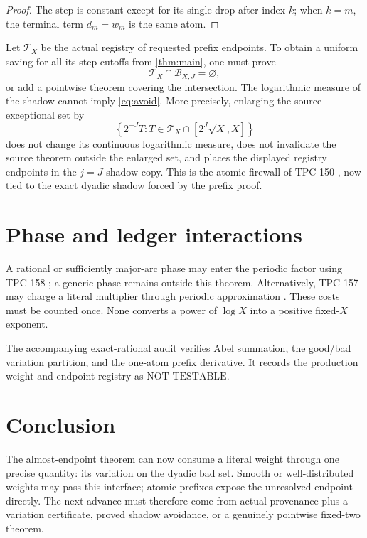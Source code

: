 \documentclass[11pt]{article}
\theoremstyle{definition}
\newcommand{\Bbad}{\mathcal B}
\newcommand{\Treg}{\mathcal T}
\begin{document}
\begin{proof}
The step is constant except for its single drop after index \(k\);
when \(k=m\), the terminal term \(d_m=w_m\) is the same atom.
\end{proof}

Let \(\Treg_X\) be the actual registry of requested prefix endpoints.
To obtain a uniform saving for all its step cutoffs from
\cref{thm:main}, one must prove
\begin{equation}
 \boxed{\quad
 \Treg_X\cap\Bbad_{X,J}=\varnothing,
 \quad}
\label{eq:avoid}
\end{equation}
or add a pointwise theorem covering the intersection.
The logarithmic measure of the shadow cannot imply
\eqref{eq:avoid}.  More precisely, enlarging the source exceptional
set by
\[
 \left\{2^{-J}T:
 T\in\Treg_X\cap[2^J\sqrt X,X]\right\}
\]
does not change its continuous logarithmic measure, does not
invalidate the source theorem outside the enlarged set, and places
the displayed registry endpoints in the \(j=J\) shadow copy.
This is the atomic firewall of TPC-150 \citep{WangTPC150}, now tied
to the exact dyadic shadow forced by the prefix proof.

\section{Phase and ledger interactions}

A rational or sufficiently major-arc phase may enter the periodic
factor using TPC-158 \citep{WangTPC158}; a generic phase remains
outside this theorem.  Alternatively, TPC-157 may charge a literal
multiplier through periodic approximation \citep{WangTPC157}.
These costs must be counted once.  None converts a power of
\(\log X\) into a positive fixed-\(X\) exponent.

The accompanying exact-rational audit verifies Abel summation,
the good/bad variation partition, and the one-atom prefix derivative.
It records the production weight and endpoint registry as
\(\mathrm{NOT\mbox{-}TESTABLE}\).

\section{Conclusion}

The almost-endpoint theorem can now consume a literal weight through
one precise quantity: its variation on the dyadic bad set.  Smooth or
well-distributed weights may pass this interface; atomic prefixes
expose the unresolved endpoint directly.  The next advance must
therefore come from actual provenance plus a variation certificate,
proved shadow avoidance, or a genuinely pointwise fixed-two theorem.



\end{document}
